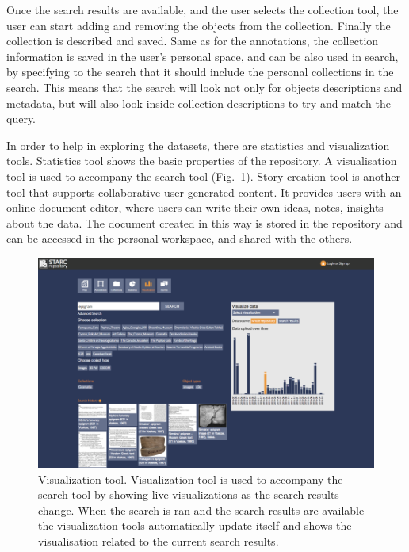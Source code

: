 \documentclass[amsthm,ebook]{saparticle}
\begin{document}
Once the search results are available, and the user selects the collection tool, the user can start adding and removing
the objects from the collection. Finally the collection is described and saved. Same as for the annotations, the
collection information is saved in the user’s personal space, and can be also used in search, by specifying to the
search that it should include the personal collections in the search. This means that the search will look not only for
objects descriptions and metadata, but will also look inside collection descriptions to try and match the query. 

In order to help in exploring the datasets, there are statistics and visualization tools. Statistics tool shows the
basic properties of the repository. A visualisation tool is used to accompany the search tool (Fig.~\ref{fig:3}). Story creation
tool is another tool that supports collaborative user generated content. It provides users with an online document
editor, where users can write their own ideas, notes, insights about the data. The document created in this way is
stored in the repository and can be accessed in the personal workspace, and shared with the others. 




\begin{figure}[!hbp]
\centering
 \includegraphics[width=\columnwidth]{DamnjanovicetalEAGLE2016-img003.png}
\caption{Visualization tool. Visualization tool is used to accompany the search tool by showing live visualizations as
the search results change. When the search is ran and the search results are available the visualization tools
automatically update itself and shows the visualisation related to the current search results. }
\label{fig:3}
\end{figure}
\end{document}
